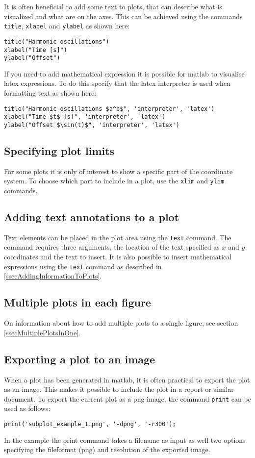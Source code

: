 It is often beneficial to add some text to plots, 
that can describe what is visualized and what are on the 
axes. 
This can be achieved using the commands \verb!title!, 
\verb!xlabel! and \verb!ylabel! as shown here:
\begin{lstlisting}
title("Harmonic oscillations")
xlabel("Time [s]")
ylabel("Offset")
\end{lstlisting}

If you need to add mathematical expression it is possible 
for matlab to visualise latex expressions.
To do this specify that the latex interpreter is used when 
formatting text as shown here:
\begin{lstlisting}
title("Harmonic oscillations $a^b$", 'interpreter', 'latex')
xlabel("Time $t$ [s]", 'interpreter', 'latex')
ylabel("Offset $\sin(t)$", 'interpreter', 'latex')
\end{lstlisting}


\subsection{Specifying plot limits}

For some plots it is only of interest to show a specific 
part of the coordinate system.
To choose which part to include in a plot, use the 
\verb!xlim! and \verb!ylim! commands.


\subsection{Adding text annotations to a plot}

Text elements can be placed in the plot area
using the \verb!text! command.
The command requires three arguments, the location of the 
text specified as $x$ and $y$ coordinates and the 
text to insert.
It is also possible to insert mathematical expressions
using the \verb!text! command as described in 
\ref{ssecAddingInformationToPlots}.


\subsection{Multiple plots in each figure}

On information about how to add multiple
plots to a single figure, see section 
\ref{ssecMultiplePlotsInOne}.


\subsection{Exporting a plot to an image}

When a plot has been generated in matlab, 
it is often practical to export the plot as an image.
This makes it possible to include the plot in a 
report or similar document.
To export the current plot as a png image, the command
\verb!print! can be used as follows:
\begin{lstlisting}
print('subplot_example_1.png', '-dpng', '-r300');
\end{lstlisting}
In the example the print command takes a filename as input 
as well two options specifying the fileformat (png) 
and resolution of the exported image.


 